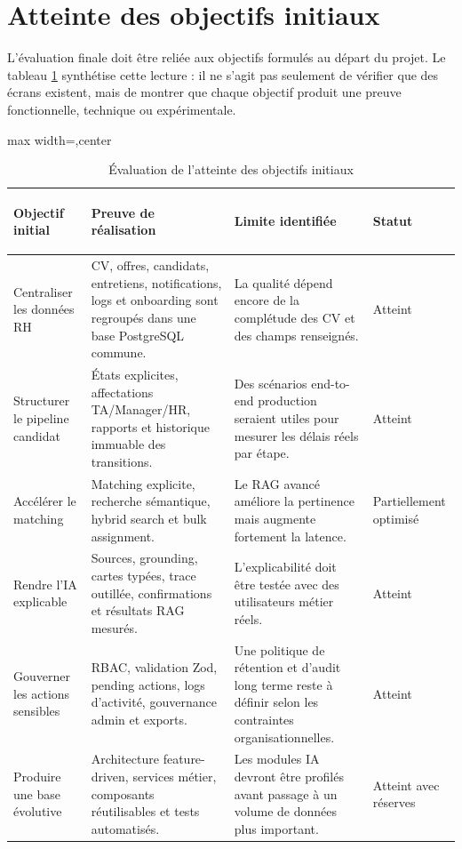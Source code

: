 \section*{Atteinte des objectifs initiaux}
L'évaluation finale doit être reliée aux objectifs formulés au départ du projet. Le tableau \ref{tab:objective-achievement} synthétise cette lecture : il ne s'agit pas seulement de vérifier que des écrans existent, mais de montrer que chaque objectif produit une preuve fonctionnelle, technique ou expérimentale.

\begin{table}[H]
  \centering
  \scriptsize
  \caption{\label{tab:objective-achievement}Évaluation de l'atteinte des objectifs initiaux}
  \begin{adjustbox}{max width=\linewidth,center}
  \begin{tabularx}{\textwidth}{>{\bfseries\raggedright\arraybackslash}p{2.8cm}>{\raggedright\arraybackslash}X>{\raggedright\arraybackslash}X>{\raggedright\arraybackslash}p{2cm}}
    \toprule
    Objectif initial & Preuve de réalisation & Limite identifiée & Statut \\
    \midrule
    Centraliser les données RH & CV, offres, candidats, entretiens, notifications, logs et onboarding sont regroupés dans une base PostgreSQL commune. & La qualité dépend encore de la complétude des CV et des champs renseignés. & Atteint \\
    Structurer le pipeline candidat & États explicites, affectations TA/Manager/HR, rapports et historique immuable des transitions. & Des scénarios end-to-end production seraient utiles pour mesurer les délais réels par étape. & Atteint \\
    Accélérer le matching & Matching explicite, recherche sémantique, hybrid search et bulk assignment. & Le RAG avancé améliore la pertinence mais augmente fortement la latence. & Partiellement optimisé \\
    Rendre l'IA explicable & Sources, grounding, cartes typées, trace outillée, confirmations et résultats RAG mesurés. & L'explicabilité doit être testée avec des utilisateurs métier réels. & Atteint \\
    Gouverner les actions sensibles & RBAC, validation Zod, pending actions, logs d'activité, gouvernance admin et exports. & Une politique de rétention et d'audit long terme reste à définir selon les contraintes organisationnelles. & Atteint \\
    Produire une base évolutive & Architecture feature-driven, services métier, composants réutilisables et tests automatisés. & Les modules IA devront être profilés avant passage à un volume de données plus important. & Atteint avec réserves \\
    \bottomrule
  \end{tabularx}
  \end{adjustbox}
\end{table}

